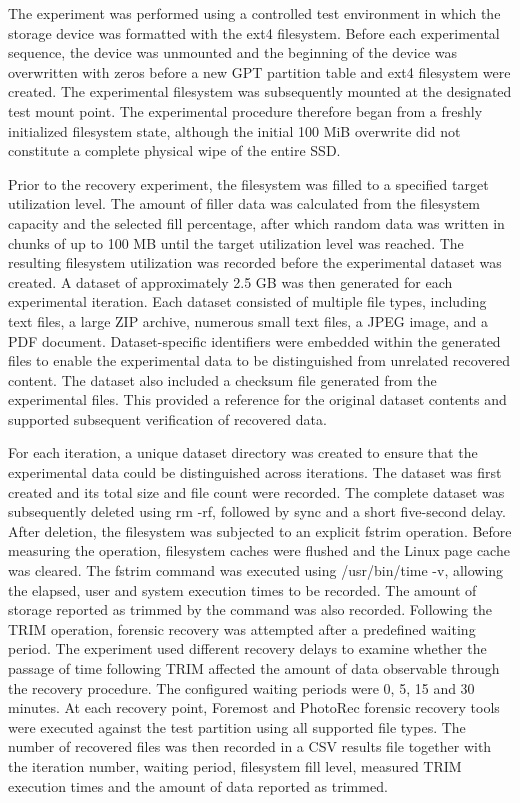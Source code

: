 The experiment was performed using a controlled test environment in which the storage device was formatted with the ext4 filesystem. Before each experimental sequence, 
the device was unmounted and the beginning of the device was overwritten with zeros before a new GPT partition table and ext4 filesystem were created. The experimental 
filesystem was subsequently mounted at the designated test mount point. The experimental procedure therefore began from a freshly initialized filesystem state, although 
the initial 100 MiB overwrite did not constitute a complete physical wipe of the entire SSD.


Prior to the recovery experiment, the filesystem was filled to a specified target utilization level. The amount of filler data was calculated from the filesystem capacity 
and the selected fill percentage, after which random data was written in chunks of up to 100 MB until the target utilization level was reached. The resulting filesystem 
utilization was recorded before the experimental dataset was created. A dataset of approximately 2.5 GB was then generated for each experimental iteration. Each dataset 
consisted of multiple file types, including text files, a large ZIP archive, numerous small text files, a JPEG image, and a PDF document. Dataset-specific identifiers 
were embedded within the generated files to enable the experimental data to be distinguished from unrelated recovered content. The dataset also included a checksum file 
generated from the experimental files. This provided a reference for the original dataset contents and supported subsequent verification of recovered data.


For each iteration, a unique dataset directory was created to ensure that the experimental data could be distinguished across iterations. The dataset was first created 
and its total size and file count were recorded. The complete dataset was subsequently deleted using rm -rf, followed by sync and a short five-second delay. After 
deletion, the filesystem was subjected to an explicit fstrim operation. Before measuring the operation, filesystem caches were flushed and the Linux page cache was 
cleared. The fstrim command was executed using /usr/bin/time -v, allowing the elapsed, user and system execution times to be recorded. The amount of storage reported as 
trimmed by the command was also recorded. Following the TRIM operation, forensic recovery was attempted after a predefined waiting period. The experiment used different 
recovery delays to examine whether the passage of time following TRIM affected the amount of data observable through the recovery procedure. The configured waiting 
periods were 0, 5, 15 and 30 minutes. At each recovery point, Foremost and PhotoRec forensic recovery tools were executed against the test partition using all supported file types. 
The number of recovered files was then recorded in a CSV results file together with the iteration number, waiting period, filesystem fill level, measured TRIM execution 
times and the amount of data reported as trimmed.


